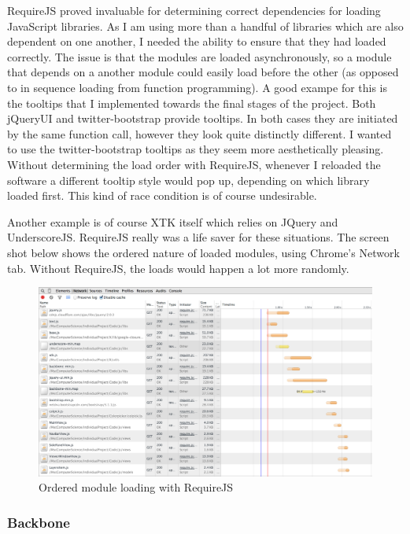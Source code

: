 \documentclass[a4paper,11pt,titlepage]{article}
\begin{document}
RequireJS proved invaluable for determining correct dependencies for loading JavaScript libraries.
As I am using more than a handful of libraries which are also dependent on one another, I needed the ability to ensure that they had loaded correctly. The issue is that the modules are loaded asynchronously, so a module that depends on a another module could easily load before the other (as opposed to in sequence loading from function programming). A good exampe for this is the tooltips that I implemented towards the final stages of the project. Both jQueryUI and twitter-bootstrap provide tooltips. In both cases they are initiated by the same function call, however they look quite distinctly different. I wanted to use the twitter-bootstrap tooltips as they seem more aesthetically pleasing. Without determining the load order with RequireJS, whenever I reloaded the software a different tooltip style would pop up, depending on which library loaded first. This kind of race condition is of course undesirable.

Another example is of course XTK itself which relies on JQuery and UnderscoreJS. RequireJS really was a life saver for these situations. The screen shot below shows the ordered nature of loaded modules, using Chrome's Network tab. Without RequireJS, the loads would happen a lot more randomly.


\begin{figure}[ht!]
\centering
\includegraphics[width=120mm]{graphics/requireOrder_01.png}
\caption{Ordered module loading with RequireJS}
\label{fig:UIdesign1}
\end{figure}





\subsubsection{Backbone}
\end{document}
